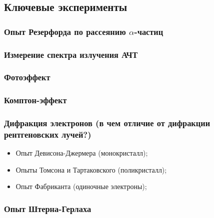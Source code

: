 \subsection{Ключевые эксперименты}

\subsubsection{Опыт Резерфорда по рассеянию $\alpha$-частиц}


\subsubsection{Измерение спектра излучения АЧТ}


\subsubsection{Фотоэффект}


\subsubsection{Комптон-эффект}


\subsubsection{Дифракция электронов (в чем отличие от дифракции рентгеновских лучей?)}
\begin{itemize}
	\item Опыт Девисона-Джермера (монокристалл);
	\item Опыты Томсона и Тартаковского (поликристалл);
	\item Опыт Фабриканта (одиночные электроны);
\end{itemize}


\subsubsection{Опыт Штерна-Герлаха}

